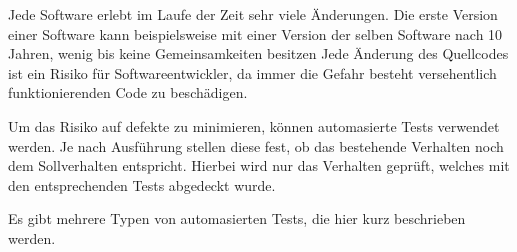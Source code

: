

Jede Software erlebt im Laufe der Zeit sehr viele Änderungen. 
Die erste Version einer Software kann beispielsweise mit einer Version der selben Software nach 10 Jahren, wenig bis keine Gemeinsamkeiten besitzen
Jede Änderung des Quellcodes ist ein Risiko für Softwareentwickler, da immer die Gefahr besteht versehentlich funktionierenden Code zu beschädigen.

Um das Risiko auf defekte zu minimieren, können automasierte Tests verwendet werden. Je nach Ausführung stellen diese fest,
ob das bestehende Verhalten noch dem Sollverhalten entspricht. Hierbei wird nur das Verhalten geprüft, 
welches mit den entsprechenden Tests abgedeckt wurde.

Es gibt mehrere Typen von automasierten Tests, die hier kurz beschrieben werden.


